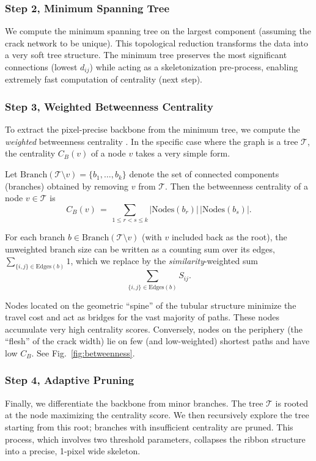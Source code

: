 \documentclass[conference]{IEEEtran}
\begin{document}
\subsubsection{Step 2, Minimum Spanning Tree}
We compute the minimum spanning tree on the largest component (assuming the crack network to be unique). This topological reduction transforms the data into a very soft tree structure. The minimum tree preserves the most significant connections (lowest $d_{ij}$) while acting as a skeletonization pre-process, enabling extremely fast computation of centrality (next step).


\subsubsection{Step 3, Weighted Betweenness Centrality}
To extract the pixel-precise backbone from the minimum tree, we compute the {\emph{weighted} betweenness centrality} %
\cite{Brandes2001}. 
In the specific case where the graph is a tree $\mathcal T$, the centrality $C_B(v)$ of a node $v$ takes a very simple form. 

Let $\text{Branch}(\mathcal{T}\setminus v)=\{b_1,\dots,b_k\}$ denote the set of connected components (branches) obtained by removing $v$ from $\mathcal{T}$. 
Then the betweenness centrality of a node $v \in \mathcal T$ is
\begin{equation}
    C_B(v) \,=\, \sum_{1\le r<s\le k} \bigl|\mathrm{Nodes}(b_r)\bigr|\,\bigl|\mathrm{Nodes}(b_s)\bigr|.
\end{equation}

For each branch $b\in \mathrm{Branch}(\mathcal{T}\setminus v)$ (with $v$ included back as the root), the unweighted branch size can be written as a counting sum over its edges, $\sum_{\{i,j\}\in \mathrm{Edges}(b)} 1$, which we replace by the \emph{similarity}-weighted sum $$\sum_{\{i,j\}\in \mathrm{Edges}(b)} S_{ij}.$$

Nodes located on the geometric ``spine'' of the tubular structure minimize the travel cost and act as bridges for the vast majority of paths. These nodes accumulate very high centrality scores. Conversely, nodes on the periphery (the ``flesh'' of the crack width) lie on few (and low-weighted) shortest paths and have low $C_B$.
See Fig.~\ref{fig:betweenness}.

\subsubsection{Step 4, Adaptive Pruning}
Finally, we differentiate the backbone from minor branches. The tree $\mathcal{T}$ is rooted at the node maximizing the centrality score. We then recursively explore the tree starting from this root; branches with insufficient centrality are pruned. This process, which involves two threshold parameters, collapses the ribbon structure into a precise, 1-pixel wide skeleton.
\end{document}
